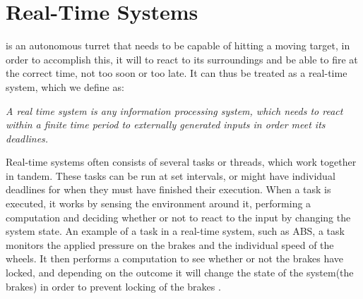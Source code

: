 \section{Real-Time Systems}\label{rts}

\name is an autonomous turret that needs to be capable of hitting a moving
target, in order to accomplish this, it will to react to its surroundings and
be able to fire at the correct time, not too soon or too late. It can thus be
treated as a real-time system, which we define as:


\begin{center}
\begin{minipage}{0.8\linewidth}
\textit{A real time system is any information processing system, which needs to
react within a finite time period to externally generated inputs in order meet
its deadlines.}
\end{minipage}
\end{center} 

Real-time systems often consists of several tasks or threads, which work
together in tandem. These tasks can be run at set intervals, or might have
individual deadlines for when they must have finished their execution. When a
task is executed, it works by sensing the environment around it, performing a
computation and deciding whether or not to react to the input by changing the
system state. An example of a task in a real-time system, such as ABS, a task
monitors the applied pressure on the brakes and the individual speed of the
wheels. It then performs a computation to see whether or not the brakes have
locked, and depending on the outcome it will change the state of the system(the
brakes) in order to prevent locking of the brakes \citep[ch.1A]{Realtime}.


% 

